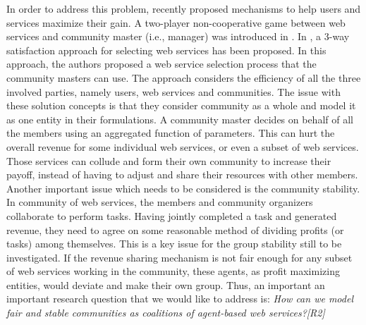In order to address this problem, recently
\cite{DBLP:conf/IEEEscc/LimTMB12,
DBLP:conf/IEEEscc/KhosravifarABT11, 10.1109/TSC.2012.12} proposed
mechanisms to help users and services maximize their gain. A
two-player non-cooperative game between web services and community master (i.e., manager) was introduced in
\cite{DBLP:conf/IEEEscc/KhosravifarABT11}. In
\cite{DBLP:conf/IEEEscc/LimTMB12}, a 3-way satisfaction approach
for selecting web services has been proposed. In this approach,
the authors proposed a web service selection process that the
community masters can use. The approach considers the efficiency
of all the three involved parties, namely users, web services and
communities. The issue with these solution concepts is that they
consider community as a whole and model it as one entity in their
formulations. A community master decides on behalf of all the
members using an aggregated function of parameters. This can hurt
the overall revenue for some individual web services, or even a
subset of web services. Those services can collude and form their
own community to increase their payoff, instead of having to adjust and share
their resources with other members. Another important issue which
needs to be considered is the community stability. In community of
web services, the members and community organizers collaborate to
perform tasks. Having jointly completed a task and generated
revenue, they need to agree on some reasonable method of dividing
profits (or tasks) among themselves. This is a key issue for the
group stability still to be investigated. If the revenue sharing
mechanism is not fair enough for any subset of web services
working in the community, these agents, as profit maximizing
entities, would deviate and make their own group. Thus, an important an
important research question that we would like to address is:
\emph{How can we model fair and stable communities as coalitions
of agent-based web services?[R2]}




